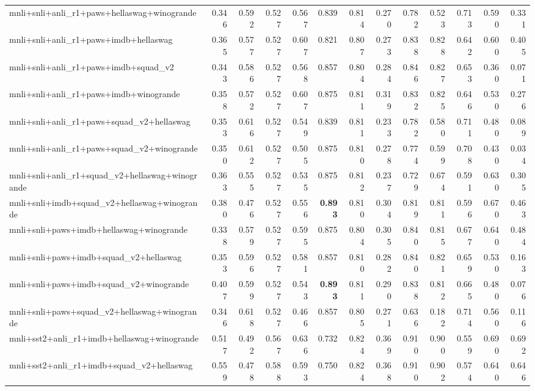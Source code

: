 \begin{table}[t]
\begin{tabular}{lrrrrrrrrrrrr}
    mnli+snli+anli\_r1+paws+hellaswag+winogrande & 0.346 & 0.592 & 0.527 & 0.567 & 0.839 & 0.814 & 0.270 & 0.782 & 0.523 & 0.713 & 0.590 & 0.331 \\
    mnli+snli+anli\_r1+paws+imdb+hellaswag & 0.365 & 0.577 & 0.527 & 0.607 & 0.821 & 0.807 & 0.273 & 0.838 & 0.828 & 0.642 & 0.600 & 0.405 \\
    mnli+snli+anli\_r1+paws+imdb+squad\_v2 & 0.343 & 0.586 & 0.527 & 0.568 & 0.857 & 0.804 & 0.284 & 0.846 & 0.827 & 0.653 & 0.360 & 0.071 \\
    mnli+snli+anli\_r1+paws+imdb+winogrande & 0.358 & 0.572 & 0.527 & 0.607 & 0.875 & 0.811 & 0.319 & 0.832 & 0.825 & 0.646 & 0.530 & 0.276 \\
    mnli+snli+anli\_r1+paws+squad\_v2+hellaswag & 0.353 & 0.616 & 0.527 & 0.549 & 0.839 & 0.811 & 0.233 & 0.782 & 0.580 & 0.711 & 0.480 & 0.089 \\
    mnli+snli+anli\_r1+paws+squad\_v2+winogrande & 0.350 & 0.612 & 0.527 & 0.505 & 0.875 & 0.810 & 0.278 & 0.774 & 0.599 & 0.708 & 0.430 & 0.034 \\
    mnli+snli+anli\_r1+squad\_v2+hellaswag+winogrande & 0.363 & 0.555 & 0.527 & 0.535 & 0.875 & 0.812 & 0.237 & 0.729 & 0.674 & 0.591 & 0.630 & 0.305 \\
    mnli+snli+imdb+squad\_v2+hellaswag+winogrande & 0.380 & 0.476 & 0.527 & 0.556 & \textbf{0.893} & 0.810 & 0.304 & 0.819 & 0.811 & 0.596 & 0.670 & 0.463 \\
    mnli+snli+paws+imdb+hellaswag+winogrande & 0.338 & 0.579 & 0.527 & 0.595 & 0.875 & 0.804 & 0.305 & 0.840 & 0.815 & 0.677 & 0.640 & 0.484 \\
    mnli+snli+paws+imdb+squad\_v2+hellaswag & 0.353 & 0.596 & 0.527 & 0.581 & 0.857 & 0.810 & 0.282 & 0.840 & 0.821 & 0.659 & 0.530 & 0.163 \\
    mnli+snli+paws+imdb+squad\_v2+winogrande & 0.407 & 0.599 & 0.527 & 0.543 & \textbf{0.893} & 0.811 & 0.290 & 0.838 & 0.812 & 0.665 & 0.480 & 0.076 \\
    mnli+snli+paws+squad\_v2+hellaswag+winogrande & 0.346 & 0.618 & 0.527 & 0.466 & 0.857 & 0.805 & 0.271 & 0.636 & 0.182 & 0.714 & 0.560 & 0.116 \\
    mnli+sst2+anli\_r1+imdb+hellaswag+winogrande & 0.517 & 0.492 & 0.567 & 0.636 & 0.732 & 0.824 & 0.369 & 0.910 & 0.900 & 0.559 & 0.690 & 0.692 \\
    mnli+sst2+anli\_r1+imdb+squad\_v2+hellaswag & 0.559 & 0.478 & 0.588 & 0.593 & 0.750 & 0.824 & 0.368 & 0.910 & 0.902 & 0.574 & 0.640 & 0.646 \\

\end{tabular}
\end{table}
